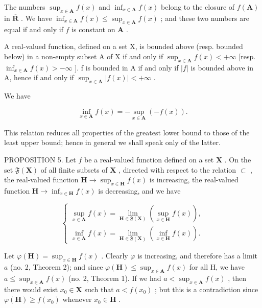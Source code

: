 The numbers \(\sup_{x\in\mathbf{A}}f(x)\) and \(\inf_{x\in\mathbf{A}}f(x)\) belong to the closure of \(f(\mathbf{A})\) in \(\overline{\mathbf{R}}\) . We have \(\inf_{x\in\mathbf{A}}f(x)\leqslant\sup_{x\in\mathbf{A}}f(x)\) ; and these two numbers are equal if and only if \(f\) is constant on \(\mathbf{A}\) .

A real-valued function, defined on a set X, is bounded above (resp. bounded below) in a non-empty subset A of X if and only if \(\sup_{x\in\mathbf{A}}f(x)<+\infty\) {[}resp. \(\inf_{x\in\mathbf{A}}f(x)>-\infty\) {]}. f is bounded in A if and only if \(|f|\) is bounded above in A, hence if and only if \(\sup_{x\in\mathbf{A}}|f(x)|<+\infty\) .

We have

\[
\inf _ {x \in \mathbf {A}} f (x) = - \sup _ {x \in \mathbf {A}} (- f (x)).\tag{2}
\]

This relation reduces all properties of the greatest lower bound to those of the least upper bound; hence in general we shall speak only of the latter.

PROPOSITION 5. Let \(f\) be a real-valued function defined on a set \(\mathbf{X}\) . On the set \(\mathfrak{F}(\mathbf{X})\) of all finite subsets of \(\mathbf{X}\) , directed with respect to the relation \(\subset\) , the real-valued function \(\mathbf{H} \to \sup_{x \in \mathbf{H}} f(x)\) is increasing, the real-valued function \(\mathbf{H} \to \inf_{x \in \mathbf{H}} f(x)\) is decreasing, and we have

\[
\left\{ \begin{array}{l} \sup _ {x \in \mathbf {A}} f (x) = \lim _ {\mathbf {H} \in \mathfrak {F} (\mathbf {X})} (\sup _ {x \in \mathbf {H}} f (x)), \\ \inf _ {x \in \mathbf {A}} f (x) = \lim _ {\mathbf {H} \in \mathfrak {F} (\mathbf {X})} (\inf _ {x \in \mathbf {H}} f (x)). \end{array} \right.\tag{3}
\]

Let \(\varphi(\mathbf{H}) = \sup_{x \in \mathbf{H}} f(x)\) . Clearly \(\varphi\) is increasing, and therefore has a limit \(a\) (no. 2, Theorem 2); and since \(\varphi(\mathbf{H}) \leqslant \sup_{x \in \mathbf{A}} f(x)\) for all H, we have \(a \leqslant \sup_{x \in \mathbf{A}} f(x)\) (no. 2, Theorem 1). If we had \(a < \sup_{x \in \mathbf{A}} f(x)\) , then there would exist \(x_0 \in \mathbf{X}\) such that \(a < f(x_0)\) ; but this is a contradiction since \(\varphi(\mathbf{H}) \geqslant f(x_0)\) whenever \(x_0 \in \mathbf{H}\) .

